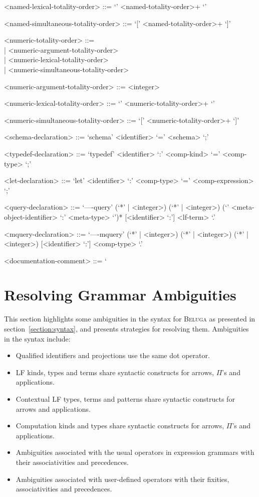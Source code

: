 \documentclass[11pt]{article}
\newcommand{\Beluga}{\textsc{Beluga}\xspace}
\newcommand{\LF}{\textsc{LF}\xspace}
\begin{document}
\begin{grammar}
<named-lexical-totality-order> ::= `{' <named-totality-order>+ `}'

<named-simultaneous-totality-order> ::= `[' <named-totality-order>+ `]'

<numeric-totality-order> ::= \hfill\\
| <numeric-argument-totality-order>\\
| <numeric-lexical-totality-order>\\
| <numeric-simultaneous-totality-order>

<numeric-argument-totality-order> ::= <integer>

<numeric-lexical-totality-order> ::= `{' <numeric-totality-order>+ `}'

<numeric-simultaneous-totality-order> ::= `[' <numeric-totality-order>+ `]'

<schema-declaration> ::= `schema' <identifier> `=' <schema> `;'

<typedef-declaration> ::= `typedef' <identifier> `:' <comp-kind> `=' <comp-type> `;'

<let-declaration> ::= `let' <identifier> `:' <comp-type> `=' <comp-expression> `;'

<query-declaration> ::= `----query' (`*' | <integer>) (`*' | <integer>) (`{' <meta-object-identifier> `:' <meta-type> `}')* [<identifier> `:'] <lf-term> `.'

<mquery-declaration> ::= `----mquery' (`*' | <integer>) (`*' | <integer>) (`*' | <integer>) [<identifier> `:'] <comp-type> `.'

<documentation-comment> ::= `%
\end{grammar}

\section{Resolving Grammar Ambiguities}\label{section:resolving-grammar-ambiguities}

This section highlights some ambiguities in the syntax for \Beluga as presented in section~\ref{section:syntax}, and presents strategies for resolving them.
Ambiguities in the syntax include:
\begin{itemize}
\item Qualified identifiers and projections use the same dot operator.
\item \LF kinds, types and terms share syntactic constructs for arrows, $ \Pi $'s and applications.
\item Contextual \LF types, terms and patterns share syntactic constructs for arrows and applications.
\item Computation kinds and types share syntactic constructs for arrows, $ \Pi $'s and applications.
\item Ambiguities associated with the usual operators in expression grammars with their associativities and precedences.
\item Ambiguities associated with user-defined operators with their fixities, associativities and precedences.
\end{itemize}
\end{document}
